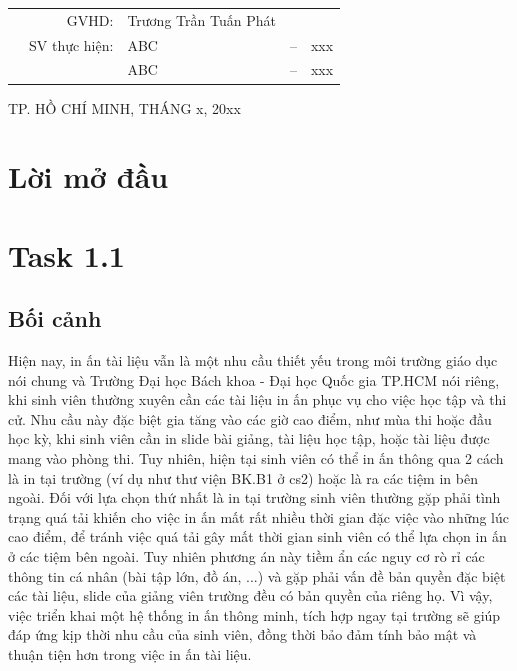 \documentclass[a4paper]{article}
\begin{document}
\begin{titlepage}
\vspace{0.3cm}

	\begin{table}[h]
		\centering
		\begin{tabular}{rrlcl}
			\hspace{2.25 cm} & GVHD: & Trương Trần Tuấn Phát & & \\
			& SV thực hiện: & ABC & -- & xxx \\
            & & ABC & -- & xxx \\
		\end{tabular}
	\end{table}


\begin{center}
{\footnotesize TP. HỒ CHÍ MINH, THÁNG x, 20xx}
\end{center}
\end{titlepage}


\newpage
\tableofcontents
\newpage
\section*{Lời mở đầu}

\newpage
\section{Task 1.1}
\subsection{Bối cảnh}
Hiện nay, in ấn tài liệu vẫn là một nhu cầu thiết yếu trong môi trường giáo dục nói chung và Trường Đại học Bách khoa - Đại học Quốc gia TP.HCM nói riêng, khi sinh viên thường xuyên cần các tài liệu in ấn phục vụ cho việc học tập và thi cử. Nhu cầu này đặc biệt gia tăng vào các giờ cao điểm, như mùa thi hoặc đầu học kỳ, khi sinh viên cần in slide bài giảng, tài liệu học tập, hoặc tài liệu được mang vào phòng thi. Tuy nhiên, hiện tại sinh viên có thể in ấn thông qua 2 cách là in tại trường (ví dụ như thư viện BK.B1 ở cs2) hoặc là ra các tiệm in bên ngoài. Đối với lựa chọn thứ nhất là in tại trường sinh viên thường gặp phải tình trạng quá tải khiến cho việc in ấn mất rất nhiều thời gian đặc việc vào những lúc cao điểm, để tránh việc quá tải gây mất thời gian sinh viên có thể lựa chọn in ấn ở các tiệm bên ngoài. Tuy nhiên phương án này tiềm ẩn các nguy cơ rò rỉ các thông tin cá nhân (bài tập lớn, đồ án, ...) và gặp phải vấn đề bản quyền đặc biệt các tài liệu, slide của giảng viên trường đều có bản quyền của riêng họ. Vì vậy, việc triển khai một hệ thống in ấn thông minh, tích hợp ngay tại trường sẽ giúp đáp ứng kịp thời nhu cầu của sinh viên, đồng thời bảo đảm tính bảo mật và thuận tiện hơn trong việc in ấn tài liệu.
\end{document}
